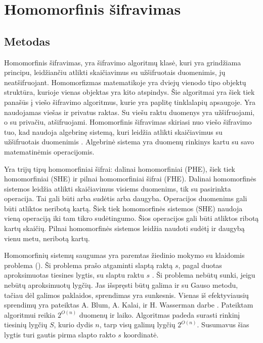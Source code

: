 \documentclass{VUMIFInfBakalaurinis}
\begin{document}
\section{Homomorfinis šifravimas}
\subsection{Metodas}
\par Homomorfinis šifravimas, yra šifravimo algoritmų klasė, kuri yra grindžiama principu, leidžiančiu atlikti skaičiavimus su užšifruotais duomenimis, jų neatšifruojant. Homomorfizmas matematikoje yra dviejų vienodo tipo objektų struktūra, kurioje vienas objektas yra kito atspindys.  Šie algoritmai yra šiek tiek panašūs į viešo šifravimo algoritmus, kurie yra paplitę tinklalapių apsaugoje. Yra naudojamas viešas ir privatus raktas. Su viešu raktu duomenys yra užšifruojami, o su privačiu, atšifruojami. Homomorfinis šifravimas skiriasi nuo viešo šifravimo tuo, kad naudoja algebrinę sistemą, kuri leidžia atlikti skaičiavimus su užšifruotais duomenimis \cite{14}. Algebrinė sistema yra duomenų rinkinys kartu su savo matematinėmis operacijomis.
\par Yra trijų tipų homomorfiniai šifrai: dalinai homomorfiniai (PHE), šiek tiek homomorfiniai (SHE) ir pilnai homomorfiniai šifrai (FHE). Dalinai homomorfinės sistemos leidžia atlikti skaičiavimus visiems duomenims, tik su pasirinkta operacija. Tai gali būti arba sudėtis arba daugyba.  Operacijos duomenims gali būti atliktos neribotą kartą.  Šiek tiek homomorfinės sistemos (SHE) naudoja vieną operaciją iki tam tikro sudėtingumo. Šios operacijos gali būti atliktos ribotą kartų skaičių. Pilnai homomorfinės sistemos leidžia naudoti sudėtį ir daugybą vienu metu, neribotą kartų. 
\par Homomorfinių sistemų saugumas yra paremtas žiedinio mokymo su klaidomis problema (). Ši problema prašo atgaminti slaptą raktą $s$, pagal duotas aproksimuotas tiesines lygtis, su slaptu raktu $s$ \cite{16}. Ši problema nebūtų sunki, jeigu nebūtų aproksimuotų lygčių. Jas išspręsti būtų galima ir su Gauso metodu, tačiau dėl galimos paklaidos, sprendimas yra sunkesnis. Vienas iš efektyviausių sprendimų yra pateiktas A. Blum, A. Kalai, ir H. Wasserman darbe \cite{15}. Pateiktam algoritmui reikia $2^{O(n)}$ duomenų ir laiko. Algoritmas padeda surasti rinkinį tiesinių lygčių $S$, kurio dydis $n$, tarp visų galimų lygčių $2^{O(n)}$. Susumavus šias lygtis turi gautis pirma slapto rakto $s$ koordinatė.
\end{document}
